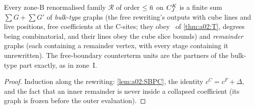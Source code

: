 \begin{lemma}\label{lem:a02:CMP}
Every zone-B renormalised family $\mathcal R$ of order $\le\bar n$ on $C^{K}_{J}$ is a finite sum $\sum G+\sum G'$ of \emph{bulk-type} graphs (the free rewriting's outputs with cube lines and live positions, free coefficients at the C-sites; they obey \DEG\ of \cref{thm:a02:T}, degrees being combinatorial, and their lines obey the cube slice bounds) and \emph{remainder} graphs (each containing a remainder vertex, with every stage containing it unrewritten). The free-boundary counterterm units are the partners of the bulk-type part exactly, as in zone~I.
\end{lemma}
\begin{proof}
Induction along the rewriting: \cref{lem:a02:SBPC}, the identity $c^C=c^F+\Delta$, and the fact that an inner remainder is never inside a collapsed coefficient (its graph is frozen before the outer evaluation).
\end{proof}

